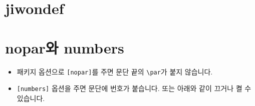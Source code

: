 \documentclass[a4paper,hcr]{oblivoir}
\begin{document}
\jiwon[23]

\begin{boxedverbatim}
\jiwon[30]
\end{boxedverbatim}

\jiwon[30]

\section{\cs jiwondef}

\begin{boxedverbatim}
\myjiwon
\end{boxedverbatim}

\myjiwon

\section{nopar와 numbers}

\begin{itemize}
\item 패키지 옵션으로 \texttt{[nopar]}를 주면 문단 끝의 \verb|\par|가 붙지 않습니다.
\end{itemize}

\jiwon*[1-3]

\begin{itemize}
\item \texttt{[numbers]} 옵션을 주면 문단에 번호가 붙습니다. 또는
아래와 같이 끄거나 켤 수 있습니다.
\end{itemize}

\begin{boxedverbatim}
\jiwonparnumberon
\end{boxedverbatim}

\jiwonparnumberon
\jiwon[1-3]

\begin{boxedverbatim}
\jiwonparnumberoff
\end{boxedverbatim}

\jiwonparnumberoff
\jiwon[4-5]
\end{document}
